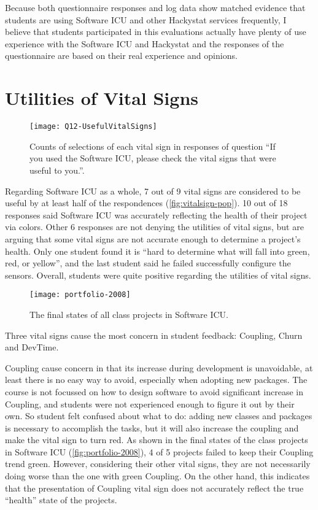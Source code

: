 Because both questionnaire responses and log data show matched evidence that students are using Software ICU and other Hackystat services frequently, I believe that students participated in this evaluations actually have plenty of use experience with the Software ICU and Hackystat and the responses of the questionnaire are based on their real experience and opinions. 

\section{Utilities of Vital Signs}

\begin{figure}[htbp] %
   \centering
   \texttt{[image: Q12-UsefulVitalSigns]} 
   \caption[Vital sign popularity from survey]{Counts of selections of each vital sign in responses of question ``If you used the Software ICU, please check the vital signs that were useful to you.''.}
   \label{fig:vitalsign-pop}
\end{figure}

Regarding Software ICU as a whole, 7 out of 9 vital signs are considered to be useful by at least half of the respondences (\autoref{fig:vitalsign-pop}). 10 out of 18 responses said Software ICU was accurately reflecting the health of their project via colors. Other 6 responses are not denying the utilities of vital signs, but are arguing that some vital signs are not accurate enough to determine a project's health. Only one student found it is ``hard to determine what will fall into green, red, or yellow'', and the last student said he failed successfully configure the sensors. Overall, students were quite positive regarding the utilities of vital signs.

\begin{figure}[htbp] %
   \centering
   \texttt{[image: portfolio-2008]} 
   \caption{The final states of all class projects in Software ICU.}
   \label{fig:portfolio-2008}
\end{figure}

Three vital signs cause the most concern in student feedback: Coupling, Churn and DevTime.

Coupling cause concern in that its increase during development is unavoidable, at least there is no easy way to avoid, especially when adopting new packages. The course is not focussed on how to design software to avoid significant increase in Coupling, and students were not experienced enough to figure it out by their own. So student felt confused about what to do: adding new classes and packages is necessary to accomplish the tasks, but it will also increase the coupling and make the vital sign to turn red. As shown in the final states of the class projects in Software ICU (\autoref{fig:portfolio-2008}), 4 of 5 projects failed to keep their Coupling trend green. However, considering their other vital signs, they are not necessarily doing worse than the one with green Coupling. On the other hand, this indicates that the presentation of Coupling vital sign does not accurately reflect the true ``health'' state of the projects.  

